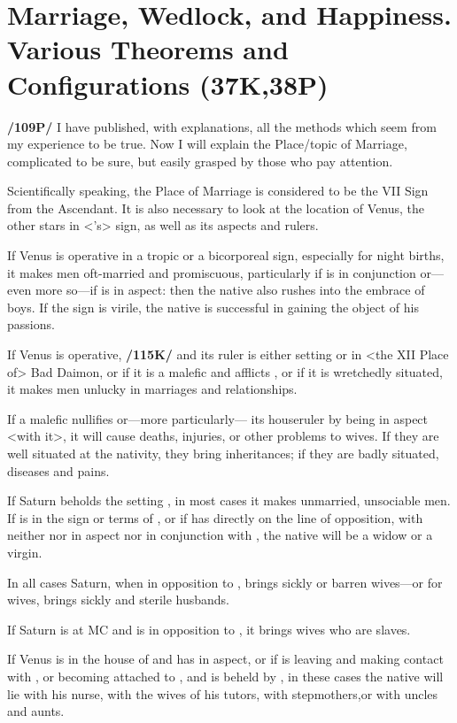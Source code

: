 \section{Marriage, Wedlock, and Happiness. Various Theorems and Configurations (37K,38P)}

\textbf{/109P/} I have published, with explanations, all the methods which seem from my experience to be true. Now
I will explain the Place/topic of Marriage, complicated to be sure, but easily grasped by those who pay attention.

Scientifically speaking, the Place of Marriage is considered to be the VII Sign from the Ascendant. It is also necessary to look at the location of Venus, the other stars in <\Venus’s> sign, as well as its aspects and rulers. 

If Venus is operative in a tropic or a bicorporeal sign, especially for night births, it makes men oft-married and promiscuous, particularly if \Mercury\xspace is in conjunction or—even more so—if \Mars\xspace is in aspect: then the native also rushes into the embrace of boys. If the sign is virile, the native is successful in gaining the object of his passions. 

If Venus is operative, \textbf{/115K/} and its ruler is either setting or in <the XII Place of> Bad Daimon, or if it is a malefic and afflicts \Venus, or if it is wretchedly situated, it makes men unlucky in marriages and relationships. 

If a malefic nullifies \Venus\xspace or—more particularly—
its houseruler by being in aspect <with it>, it will cause deaths, injuries, or other problems to wives. If they are well situated at the nativity, they bring inheritances; if they are badly situated, diseases and pains.

If Saturn beholds the setting \Venus, in most cases it makes unmarried, unsociable men. If \Venus\xspace is in the sign or terms of \Saturn, or if \Venus\xspace has \Saturn\xspace directly on the line of opposition, with neither \Mars\xspace nor \Jupiter\xspace in aspect nor \Mercury\xspace in conjunction with \Venus, the native will be a widow or a virgin. 

In all cases Saturn, when in opposition to \Venus, brings sickly or barren wives—or for wives, brings sickly and
sterile husbands. 

If Saturn is at MC and is in opposition to \Venus, it brings wives who are slaves. 

If Venus is in the house of \Saturn\xspace and has
 \Jupiter\xspace in aspect, or if \Venus\xspace is leaving \Jupiter\xspace and making contact with \Saturn, or becoming attached to \Saturn, and is beheld by \Mars, in these cases the native will lie with his nurse, with the wives of his tutors, with stepmothers,or with uncles and aunts. 

